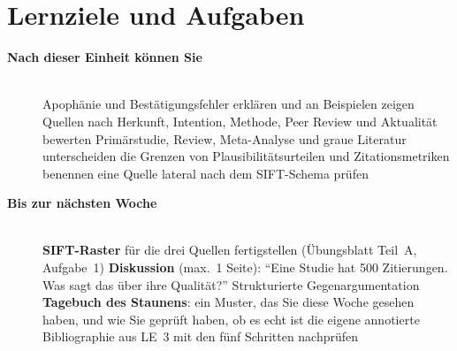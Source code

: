 \section{Lernziele und Aufgaben}
\begin{description}
\item[{\rot\bf Nach dieser Einheit können Sie}]~\\[-\lblskip]
\bi
  \ite Apophänie und Bestätigungsfehler erklären und an Beispielen zeigen
  \ite Quellen nach Herkunft, Intention, Methode, Peer Review und
    Aktualität bewerten
  \ite Primärstudie, Review, Meta-Analyse und graue Literatur
    unterscheiden
  \ite die Grenzen von Plausibilitätsurteilen und Zitationsmetriken
    benennen
  \ite eine Quelle lateral nach dem SIFT-Schema prüfen
\ei
\os{\newpage}

\item[{\rot\bf Bis zur nächsten Woche}]~\\[-\lblskip]
\bi
  \ite \textbf{SIFT-Raster} für die drei Quellen fertigstellen
    (Übungsblatt Teil~A, Aufgabe~1)
  \ite \textbf{Diskussion} (max.\ 1 Seite): \enquote{Eine Studie hat 500
    Zitierungen. Was sagt das über ihre Qualität?} Strukturierte
    Gegenargumentation
  \ite \textbf{Tagebuch des Staunens}: ein Muster, das Sie diese Woche
    gesehen haben, und wie Sie geprüft haben, ob es echt ist
  \ite die eigene annotierte Bibliographie aus LE~3 mit den fünf Schritten
    nachprüfen
\ei
\os{\newpage}
\end{description}

